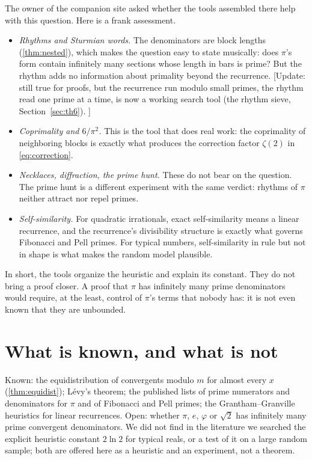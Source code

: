 The owner of the companion site asked whether the tools assembled there help with this question. Here is a frank assessment.
\begin{itemize}
\item \emph{Rhythms and Sturmian words.} The denominators are block lengths (\cref{thm:nested}), which makes the question easy to state musically: does $\pi$'s form contain infinitely many sections whose length in bars is prime? But the rhythm adds no information about primality beyond the recurrence. [Update: still true for proofs, but the recurrence run modulo small primes, the rhythm read one prime at a time, is now a working search tool (the rhythm sieve, Section~\ref{sec:th6}). \addedon{\revC}]
\item \emph{Coprimality and $6/\pi^2$.} This is the tool that does real work: the coprimality of neighboring blocks is exactly what produces the correction factor $\zeta(2)$ in \eqref{eq:correction}.
\item \emph{Necklaces, diffraction, the prime hunt.} These do not bear on the question. The prime hunt is a different experiment with the same verdict: rhythms of $\pi$ neither attract nor repel primes.
\item \emph{Self-similarity.} For quadratic irrationals, exact self-similarity means a linear recurrence, and the recurrence's divisibility structure is exactly what governs Fibonacci and Pell primes. For typical numbers, self-similarity in rule but not in shape is what makes the random model plausible.
\end{itemize}
In short, the tools organize the heuristic and explain its constant. They do not bring a proof closer. A proof that $\pi$ has infinitely many prime denominators would require, at the least, control of $\pi$'s terms that nobody has: it is not even known that they are unbounded.

\section{What is known, and what is not}

Known: the equidistribution of convergents modulo $m$ for almost every $x$ (\cref{thm:equidist}); Lévy's theorem; the published lists of prime numerators and denominators for $\pi$ and of Fibonacci and Pell primes; the Grantham--Granville heuristics for linear recurrences. Open: whether $\pi$, $e$, $\varphi$ or $\sqrt 2$ has infinitely many prime convergent denominators. We did not find in the literature we searched the explicit heuristic constant $2\ln 2$ for typical reals, or a test of it on a large random sample; both are offered here as a heuristic and an experiment, not a theorem.

